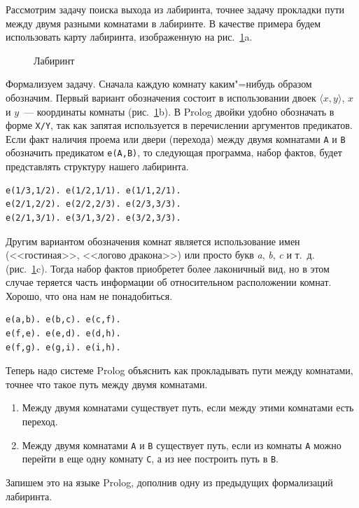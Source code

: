 \documentclass[a4paper,14pt, openany, twoside, draft]{extbook} %
\begin{document}
Рассмотрим задачу поиска выхода из лабиринта, точнее задачу прокладки пути между двумя разными комнатами в лабиринте.  В качестве примера будем использовать карту лабиринта, изображенную на рис.~\ref{fig:labyrinth}a.
\begin{figure}[hbt]
  \centering
  \def\svgwidth{\columnwidth} %
  \itshape\small
  \def\svgwidth{\columnwidth}
  
  \caption{Лабиринт}
  \label{fig:labyrinth}
\end{figure}

Формализуем задачу.  Сначала каждую комнату каким"=нибудь образом обозначим.  Первый вариант обозначения состоит в использовании двоек $\langle x,y\rangle$, $x$ и $y$~--- координаты комнаты (рис.~\ref{fig:labyrinth}b).  В Prolog двойки удобно обозначать в форме \texttt{X/Y}, так как запятая используется в перечислении аргументов предикатов.  Если факт наличия проема или двери (перехода) между двумя комнатами \texttt{A} и \texttt{B} обозначить предикатом \texttt{e(A,B)}, то следующая программа, набор фактов, будет представлять структуру нашего лабиринта.

\begin{verbatim}
e(1/3,1/2). e(1/2,1/1). e(1/1,2/1).
e(2/1,2/2). e(2/2,2/3). e(2/3,3/3).
e(2/1,3/1). e(3/1,3/2). e(3/2,3/3).
\end{verbatim}

Другим вариантом обозначения комнат является использование имен (<<гостиная>>, <<логово дракона>>) или просто букв \textit{a}, \textit{b}, \textit{c} и т.~д. (рис.~\ref{fig:labyrinth}c).  Тогда набор фактов приобретет более лаконичный вид, но в этом случае теряется часть информации об относительном расположении комнат.  Хорошо, что она нам не понадобиться.

\begin{verbatim}
e(a,b). e(b,c). e(c,f).
e(f,e). e(e,d). e(d,h).
e(f,g). e(g,i). e(i,h).
\end{verbatim}

Теперь надо системе Prolog объяснить как прокладывать пути между комнатами, точнее что такое путь между двумя комнатами.
\begin{enumerate}
\item Между двумя комнатами существует путь, если между этими комнатами есть переход.
\item Между двумя комнатами \texttt{A} и \texttt{B} существует путь, если из комнаты \texttt{A} можно перейти в еще одну комнату \texttt{C}, а из нее построить путь в \texttt{B}.
\end{enumerate}
Запишем это на языке Prolog, дополнив одну из предыдущих формализаций лабиринта.
\end{document}
